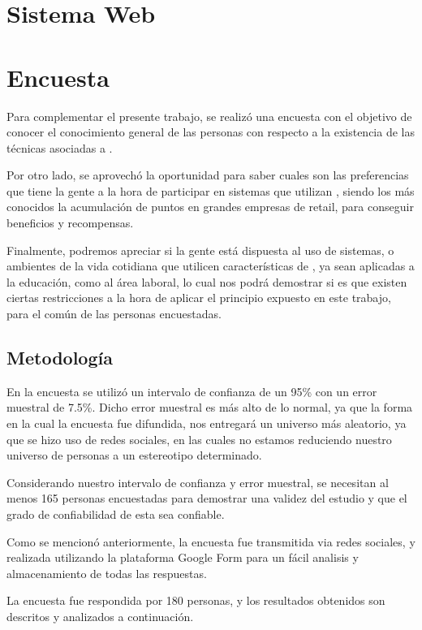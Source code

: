 \section{Sistema Web}


\section{Encuesta}

Para complementar el presente trabajo, se realizó una encuesta con el objetivo de
conocer el conocimiento general de las personas con respecto a la existencia
de las técnicas asociadas a {\GAM}.

Por otro lado, se aprovechó la oportunidad para saber cuales son las preferencias
que tiene la gente a la hora de participar en sistemas que utilizan {\GAM},
siendo los más conocidos la acumulación de puntos en grandes empresas de retail,
para conseguir beneficios y recompensas.

Finalmente, podremos apreciar si la gente está dispuesta al uso de sistemas,
o ambientes de la vida cotidiana que utilicen características de {\GAM},
ya sean aplicadas a la educación, como al área laboral, lo cual nos podrá
demostrar si es que existen ciertas restricciones a la hora de aplicar
el principio expuesto en este trabajo, para el común de las personas
encuestadas.

\subsection{Metodología}

En la encuesta se utilizó un intervalo de confianza de un 95\% con un error
muestral de 7.5\%. Dicho error muestral es más alto de lo normal, ya que la forma 
en la cual la encuesta fue difundida, nos entregará un universo más aleatorio,
 ya que se hizo uso de redes sociales, en las cuales no estamos reduciendo nuestro
 universo de personas a un estereotipo determinado.

Considerando nuestro intervalo de confianza y error muestral, se necesitan al menos 165 
personas encuestadas para demostrar una validez del estudio y que el grado de confiabilidad 
de esta sea confiable.

Como se mencionó anteriormente, la encuesta fue transmitida via redes sociales,
y realizada utilizando la plataforma Google Form para un fácil analisis y almacenamiento
 de todas las respuestas.

La encuesta fue respondida por 180 personas, y los resultados obtenidos son descritos y 
analizados a continuación.

